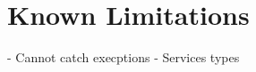 \section{Known Limitations}
\label{sec:Known_Limitations}

- Cannot catch execptions\newline
- Services types
